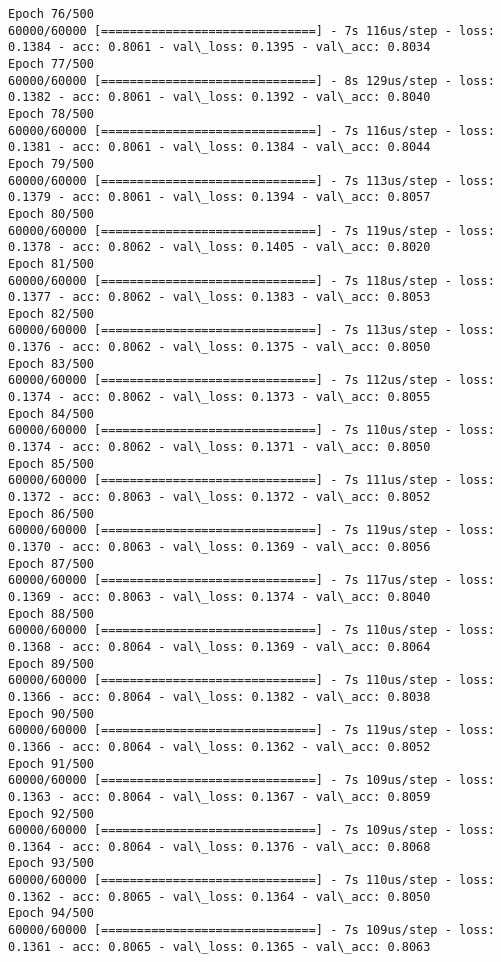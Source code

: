 \documentclass[11pt]{article}
\begin{document}
\begin{Verbatim}[commandchars=\\\{\}]
Epoch 76/500
60000/60000 [==============================] - 7s 116us/step - loss: 0.1384 - acc: 0.8061 - val\_loss: 0.1395 - val\_acc: 0.8034
Epoch 77/500
60000/60000 [==============================] - 8s 129us/step - loss: 0.1382 - acc: 0.8061 - val\_loss: 0.1392 - val\_acc: 0.8040
Epoch 78/500
60000/60000 [==============================] - 7s 116us/step - loss: 0.1381 - acc: 0.8061 - val\_loss: 0.1384 - val\_acc: 0.8044
Epoch 79/500
60000/60000 [==============================] - 7s 113us/step - loss: 0.1379 - acc: 0.8061 - val\_loss: 0.1394 - val\_acc: 0.8057
Epoch 80/500
60000/60000 [==============================] - 7s 119us/step - loss: 0.1378 - acc: 0.8062 - val\_loss: 0.1405 - val\_acc: 0.8020
Epoch 81/500
60000/60000 [==============================] - 7s 118us/step - loss: 0.1377 - acc: 0.8062 - val\_loss: 0.1383 - val\_acc: 0.8053
Epoch 82/500
60000/60000 [==============================] - 7s 113us/step - loss: 0.1376 - acc: 0.8062 - val\_loss: 0.1375 - val\_acc: 0.8050
Epoch 83/500
60000/60000 [==============================] - 7s 112us/step - loss: 0.1374 - acc: 0.8062 - val\_loss: 0.1373 - val\_acc: 0.8055
Epoch 84/500
60000/60000 [==============================] - 7s 110us/step - loss: 0.1374 - acc: 0.8062 - val\_loss: 0.1371 - val\_acc: 0.8050
Epoch 85/500
60000/60000 [==============================] - 7s 111us/step - loss: 0.1372 - acc: 0.8063 - val\_loss: 0.1372 - val\_acc: 0.8052
Epoch 86/500
60000/60000 [==============================] - 7s 119us/step - loss: 0.1370 - acc: 0.8063 - val\_loss: 0.1369 - val\_acc: 0.8056
Epoch 87/500
60000/60000 [==============================] - 7s 117us/step - loss: 0.1369 - acc: 0.8063 - val\_loss: 0.1374 - val\_acc: 0.8040
Epoch 88/500
60000/60000 [==============================] - 7s 110us/step - loss: 0.1368 - acc: 0.8064 - val\_loss: 0.1369 - val\_acc: 0.8064
Epoch 89/500
60000/60000 [==============================] - 7s 110us/step - loss: 0.1366 - acc: 0.8064 - val\_loss: 0.1382 - val\_acc: 0.8038
Epoch 90/500
60000/60000 [==============================] - 7s 119us/step - loss: 0.1366 - acc: 0.8064 - val\_loss: 0.1362 - val\_acc: 0.8052
Epoch 91/500
60000/60000 [==============================] - 7s 109us/step - loss: 0.1363 - acc: 0.8064 - val\_loss: 0.1367 - val\_acc: 0.8059
Epoch 92/500
60000/60000 [==============================] - 7s 109us/step - loss: 0.1364 - acc: 0.8064 - val\_loss: 0.1376 - val\_acc: 0.8068
Epoch 93/500
60000/60000 [==============================] - 7s 110us/step - loss: 0.1362 - acc: 0.8065 - val\_loss: 0.1364 - val\_acc: 0.8050
Epoch 94/500
60000/60000 [==============================] - 7s 109us/step - loss: 0.1361 - acc: 0.8065 - val\_loss: 0.1365 - val\_acc: 0.8063

\end{Verbatim}
\end{document}
